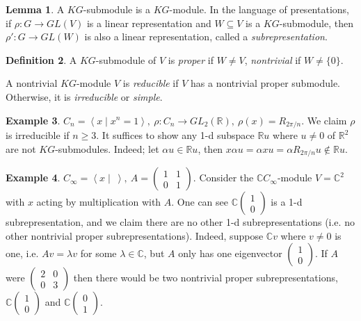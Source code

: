 \documentclass{article}
\newcommand{\la}{\left\langle}
\newcommand{\ra}{\right\rangle}
\newcommand{\R}{\mathbb{R}}
\newcommand{\C}{\mathbb{C}}
\theoremstyle{definition}
\newtheorem{defn}{Definition}[subsection]
\newtheorem{lemma}[defn]{Lemma}
\newtheorem{example}[defn]{Example}
\begin{document}
\begin{lemma}
A $KG$-submodule is a $KG$-module. In the language of presentations, if $\rho:G\rightarrow GL(V)$ is a linear representation and $W\subseteq V$ is a $KG$-submodule, then $\rho':G\rightarrow GL(W)$ is also a linear representation, called a \textit{subrepresentation}.
\end{lemma}

\begin{defn}
A $KG$-submodule of $V$ is \textit{proper} if $W\neq V$, \textit{nontrivial} if $W\neq \{0\}$.

A nontrivial $KG$-module $V$ is \textit{reducible} if $V$ has a nontrivial proper submodule. Otherwise, it is \textit{irreducible} or \textit{simple}.
\end{defn}

\begin{example}
\label{example:realrepofCnirreducible}
$C_n=\la x\mid x^n=1\ra,\ \rho:C_n\rightarrow GL_2(\R),\ \rho(x)=R_{2\pi/n}$. We claim $\rho$ is irreducible if $n\geq 3$. It suffices to show any 1-d subspace $\R u$ where $u\neq 0$ of $\R^2$ are not $KG$-submodules. Indeed; let $\alpha u\in\R u$, then $x\alpha u=\alpha xu=\alpha R_{2\pi/n}u\notin\R u$.
\end{example}

\begin{example}
\label{example:Cinfxactsby1101}
$C_\infty=\la x\mid \ \ra,\ A=\begin{pmatrix}1&1\\0&1\end{pmatrix}$. Consider the $\C C_\infty$-module $V=\C^2$ with $x$ acting by multiplication with $A$. One can see $\C\begin{pmatrix}1\\0\end{pmatrix}$ is a 1-d subrepresentation, and we claim there are no other 1-d subrepresentations (i.e. no other nontrivial proper subrepresentations). Indeed, suppose $\C v$ where $v\neq 0$ is one, i.e. $Av=\lambda v$ for some $\lambda\in\C$, but $A$ only has one eigenvector $\begin{pmatrix}1\\0\end{pmatrix}$. If $A$ were $\begin{pmatrix}2&0\\0&3\end{pmatrix}$ then there would be two nontrivial proper subrepresentations, $\C\begin{pmatrix}1\\0\end{pmatrix}$ and $\C\begin{pmatrix}0\\1\end{pmatrix}$.
\end{example}
\end{document}
